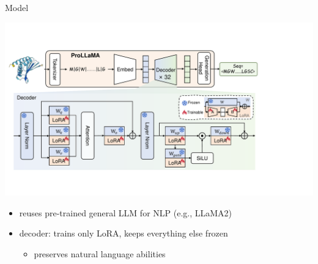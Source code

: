 \begin{frame}{Model}
	\begin{center}
		\includegraphics[scale=0.43]{images/model.pdf}
	\end{center}
	\begin{itemize}
		\item reuses pre-trained general LLM for NLP (e.g., LLaMA2)
		\item decoder: trains only LoRA, keeps everything else frozen
		\begin{itemize}
			\item preserves natural language abilities
		\end{itemize}
	\end{itemize}
\end{frame}